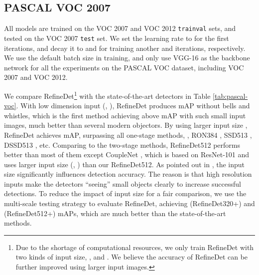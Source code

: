 \documentclass[10pt,twocolumn,letterpaper]{article}
\begin{document}
\subsection{PASCAL VOC 2007}
All models are trained on the VOC 2007 and VOC 2012 {\tt trainval} sets, and tested on the VOC 2007 {\tt test} set. We set the learning rate to  for the first  iterations, and decay it to  and  for training another  and  iterations, respectively. We use the default batch size  in training, and only use VGG-16 as the backbone network for all the experiments on the PASCAL VOC dataset, including VOC 2007 and VOC 2012.

We compare RefineDet\footnote{Due to the shortage of computational resources, we only train RefineDet with two kinds of input size, \ie,  and . We believe the accuracy of RefineDet can be further improved using larger input images.} with the state-of-the-art detectors in Table \ref{tab:pascal-voc}. With low dimension input (\ie, ), RefineDet produces  mAP without bells and whistles, which is the first method achieving above  mAP with such small input images, much better than several modern objectors. By using larger input size , RefineDet achieves  mAP, surpassing all one-stage methods, \eg, RON384 \cite{DBLP:conf/cvpr/KongSYLLC17}, SSD513 \cite{DBLP:journals/corr/FuLRTB17}, DSSD513 \cite{DBLP:journals/corr/FuLRTB17}, etc. Comparing to the two-stage methods, RefineDet512 performs better than most of them except CoupleNet \cite{DBLP:conf/iccv/abs-1708-02863}, which is based on ResNet-101 and uses larger input size (\ie, ) than our RefineDet512. As pointed out in \cite{DBLP:conf/cvpr/HuangRSZKFFWSG016}, the input size significantly influences detection accuracy. The reason is that high resolution inputs make the detectors ``seeing'' small objects clearly to increase successful detections. To reduce the impact of input size for a fair comparison, we use the multi-scale testing strategy to evaluate RefineDet, achieving  (RefineDet320+) and  (RefineDet512+) mAPs, which are much better than the state-of-the-art methods.
\end{document}
